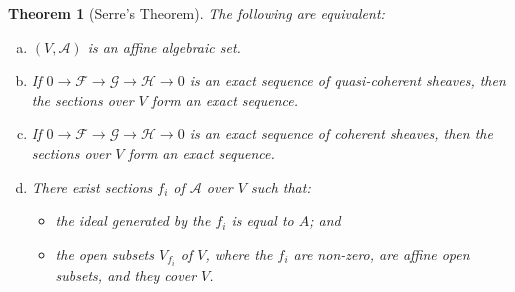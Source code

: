 \documentclass{article}
\theoremstyle{plain}
\newtheorem*{theorem}{Theorem}
\theoremstyle{definition}
\newcommand{\sh}{\mathscr}
\begin{document}
\begin{theorem}[Serre's Theorem]
  The following are equivalent:
  \begin{enumerate}[(a)]
    \item $(V,\sh{A})$ is an affine algebraic set.
    \item If $0\to\sh{F}\to\sh{G}\to\sh{H}\to0$ is an exact sequence of quasi-coherent sheaves, then the sections over $V$ form an exact sequence.
    \item If $0\to\sh{F}\to\sh{G}\to\sh{H}\to0$ is an exact sequence of coherent sheaves, then the sections over $V$ form an exact sequence.
    \item There exist sections $f_i$ of $\sh{A}$ over $V$ such that:
      \begin{itemize}
        \item the ideal generated by the $f_i$ is equal to $A$; and
        \item the open subsets $V_{f_i}$ of $V$, where the $f_i$ are non-zero, are affine open subsets, and they cover $V$.
      \end{itemize}
  \end{enumerate}
\end{theorem}
\end{document}
